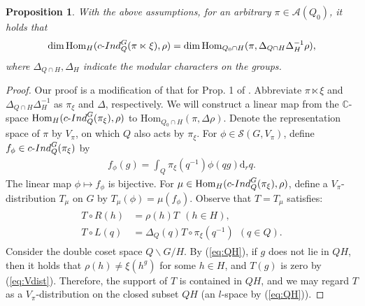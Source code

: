 \documentclass[11pt]{amsart}
\newcommand\dr{\mathrm{d}}
\newcommand\C{{\mathbb{C}}}%
\newcommand\Ss{{\mathscr{S}}}
\newcommand\1{\mathbf{1}}
\newcommand\lt{\ltimes}%
\newcommand\bs{\backslash}%
\newcommand\Hom{{\mathrm{Hom}}}%
\newcommand\cI{{\rm c\mathchar`- Ind}}
\newcommand\Alg{{\mathscr{A}}}
\numberwithin{equation}{section}
\newtheorem{prop}[thm]{Proposition}
\begin{document}
\begin{prop}
With the above assumptions, for an arbitrary $\pi \in \Alg(Q_0)$, it holds that
\begin{align*}
\dim \Hom_H(\cI_Q^G(\pi \lt \xi),\rho) = \dim \Hom_{Q_0 \cap H}(\pi,  \Delta_{Q \cap H}\Delta_H^{-1} \rho),
\end{align*}
where $\Delta_{Q \cap H}, \Delta_H$ indicate the modular characters on the groups.
\end{prop}
\begin{proof}
Our proof is a modification of that for Prop. 1 of \cite{K}.
Abbreviate $\pi \lt \xi$ and $\Delta_{Q \cap H}\Delta_H^{-1}$ as $\pi_\xi$ and $\Delta$, respectively.
We will construct a linear map from the $\C$-space $\Hom_H(\cI_Q^G(\pi_\xi),\rho)$ to $\Hom_{Q_0 \cap H}(\pi, \Delta \rho)$.
Denote the representation space of $\pi$ by $V_\pi$, on which $Q$ also acts by $\pi_\xi$.
For $\phi \in \Ss(G, V_\pi)$, define $f_\phi \in \cI_Q^G(\pi_\xi)$ by 
\begin{align*}
f_\phi(g) = \int_{Q} \pi_\xi(q^{-1})\phi(qg )\dr_rq.
\end{align*} 
The linear map $\phi \mapsto f_\phi$ is bijective.
For $\mu \in \Hom_H(\cI_Q^G(\pi_\xi),\rho)$, define a $V_\pi$-distribution $T_\mu$ on $G$ by $T_\mu(\phi) = \mu(f_\phi)$.
Observe that $T = T_\mu$ satisfies:  
\begin{align}
\begin{split}
T \circ R(h) &= \rho(h) T \ \ (h \in H), \\
T \circ L(q) &= \Delta_{Q}(q) T \circ \pi_\xi(q^{-1}) \ \ (q \in Q).
\end{split}\label{eq:Vdist}
\end{align}  
Consider the double coset space $Q \bs G / H$.
By (\ref{eq:QH}), if $g$ does not lie in $QH$, then it holds that $\rho(h) \neq \xi(h^g)$ for some $h \in H$, and $T(g)$ is zero by (\ref{eq:Vdist}). 
Therefore, the support of $T$ is contained in $QH$, and we may regard $T$ as a $V_\pi$-distribution on the closed subset $QH$ (an $l$-space by (\ref{eq:QH})).


\end{proof}
\end{document}
